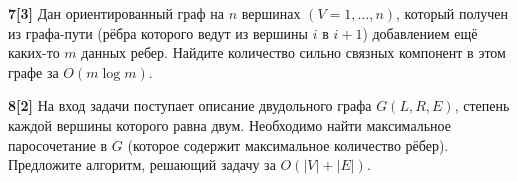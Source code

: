 \documentclass{article}
\begin{document}
\medskip

\textbf{7[3]} Дан ориентированный граф на $n$ вершинах $(V = {1, \dots,n})$, который получен из графа-пути (рёбра которого ведут из вершины $i$ в $i + 1$) добавлением ещё каких-то $m$ данных ребер. Найдите количество сильно связных компонент в этом графе за $O(m \log m)$.

\medskip

\textbf{8[2]} На вход задачи поступает описание двудольного графа $G(L, R, E)$, степень каждой вершины которого равна двум. Необходимо найти максимальное паросочетание в $G$ (которое содержит
максимальное количество рёбер). Предложите алгоритм, решающий задачу за $O(|V | + |E|)$.
\end{document}
